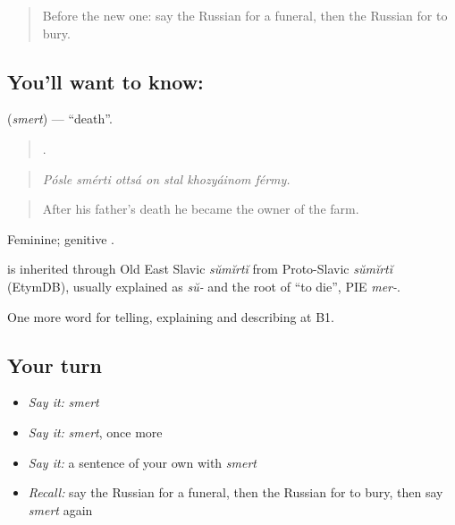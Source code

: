 \label{lesson:RU-C309-smert}



\begin{quote}
Before the new one: say the Russian for a funeral, then the Russian for to bury.
\end{quote}

\subsection*{You'll want to know: }
\textbf{} (\emph{smert}) — \textquotedblleft{}death\textquotedblright{}.

\begin{quote}
      .
\end{quote}

\begin{quote}
\emph{Pósle smérti ottsá on stal khozyáinom férmy.}
\end{quote}

\begin{quote}
After his father's death he became the owner of the farm.
\end{quote}

Feminine; genitive \emph{}.

\begin{cousinweb}
\emph{} is inherited through Old East Slavic \emph{sŭmĭrtĭ} from Proto-Slavic \emph{sŭmĭrtĭ} (EtymDB), usually explained as \emph{sŭ-} and the root of \emph{} \textquotedblleft{}to die\textquotedblright{}, PIE \emph{mer-}.
\end{cousinweb}

\begin{grammarlens}[title={What you've built}]
One more word for telling, explaining and describing at B1.
\end{grammarlens}

\subsection*{Your turn}
\begin{itemize}
\raggedright
  \item \emph{Say it:} \emph{smert}
  \item \emph{Say it:} \emph{smert}, once more
  \item \emph{Say it:} a sentence of your own with \emph{smert}
  \item \emph{Recall:} say the Russian for a funeral, then the Russian for to bury, then say \emph{smert} again
\end{itemize}

